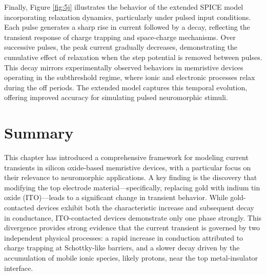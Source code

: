 \noindent Finally, Figure \ref{fig:5j} illustrates the behavior of the extended SPICE model incorporating relaxation dynamics, particularly under pulsed input conditions. Each pulse generates a sharp rise in current followed by a decay, reflecting the transient response of charge trapping and space-charge mechanisms. Over successive pulses, the peak current gradually decreases, demonstrating the cumulative effect of relaxation when the step potential is removed between pulses. This decay mirrors experimentally observed behaviors in memristive devices operating in the subthreshold regime, where ionic and electronic processes relax during the off periods. The extended model captures this temporal evolution, offering improved accuracy for simulating pulsed neuromorphic stimuli.


\section[Summary]{Summary}



\noindent This chapter has introduced a comprehensive framework for modeling current transients in silicon oxide-based memristive devices, with a particular focus on their relevance to neuromorphic applications. A key finding is the discovery that modifying the top electrode material—specifically, replacing gold with indium tin oxide (ITO)—leads to a significant change in transient behavior. While gold-contacted devices exhibit both the characteristic increase and subsequent decay in conductance, ITO-contacted devices demonstrate only one phase strongly. This divergence provides strong evidence that the current transient is governed by two independent physical processes: a rapid increase in conduction attributed to charge trapping at Schottky-like barriers, and a slower decay driven by the accumulation of mobile ionic species, likely protons, near the top metal-insulator interface.\\


